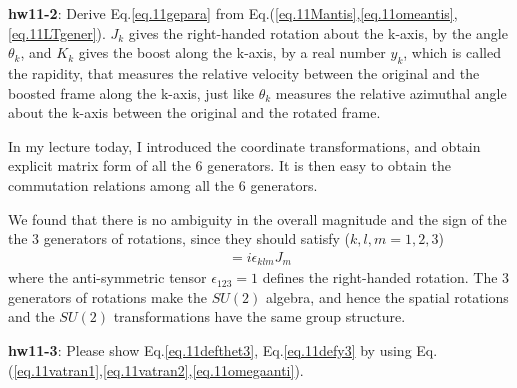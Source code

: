 \documentclass[12pt]{article}
\begin{document}
{\bf hw11-2}: Derive Eq.\ref{eq.11gepara} from Eq.(\ref{eq.11Mantis},\ref{eq.11omeantis},\ref{eq.11LTgener}). $J_k$ gives the right-handed rotation about the k-axis, by the angle $\theta_k$, and $K_k$ gives the boost along the k-axis, by a real number $y_k$, which is called the rapidity, that measures the relative velocity between the original and the boosted frame along the k-axis, just like $\theta_k$ measures the relative azimuthal angle about the k-axis between the original and the rotated frame.

  In my lecture today, I introduced the coordinate transformations,
  and obtain explicit matrix form of all the 6 generators.  It is
  then easy to obtain the commutation relations among all
  the 6 generators.

  We found that there is no ambiguity in the overall magnitude
  and the sign of the the 3 generators of rotations, since they
  should satisfy ($k,l,m = 1,2,3$)
\begin{eqnarray}
  [ J_k, J_l ] = i\epsilon_{klm} J_m
\end{eqnarray}
  where the anti-symmetric tensor $\epsilon_{123}=1$ defines the right-handed rotation. The 3 generators of rotations make the $SU(2)$ algebra, and hence the spatial rotations and the $SU(2)$ transformations have the same group structure.

{\bf hw11-3}: Please show Eq.\ref{eq.11defthet3}, Eq.\ref{eq.11defy3} by using Eq.(\ref{eq.11vatran1},\ref{eq.11vatran2},\ref{eq.11omegaanti}).
\end{document}
